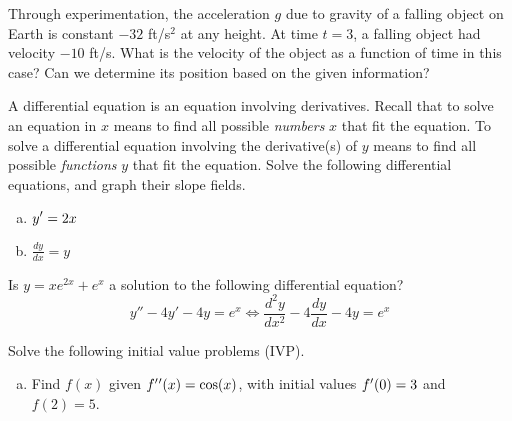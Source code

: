 \documentclass[answers]{exam}
\begin{document}
\begin{questions}
\question Through experimentation, the acceleration $g$ due to gravity of a falling object on Earth is constant $-32$ ft/s$^2$ at any height. At time $t = 3$, a falling object had velocity $-10$ ft/s. What is the velocity of the object as a function of time in this case? Can we determine its position based on the given information?

\hfill \break
\hfill \break
\hfill \break
\hfill \break
\hfill \break
\hfill \break
\hfill \break
\hfill \break
\hfill \break
\hfill \break
\hfill \break
\hfill \break
\hfill \break
\hfill \break
\hfill \break

\question A differential equation is an equation involving derivatives. Recall that to solve an equation in $x$ means to find all possible \emph{numbers} $x$ that fit the equation. To solve a differential equation involving the derivative(s) of $y$ means to find all possible \emph{functions} $y$ that fit the equation. Solve the following differential equations, and graph their slope fields.
\begin{enumerate}[(a)]
\item $\displaystyle y\rq{} = 2x$ 

\hfill \break
\hfill \break
\hfill \break
\hfill \break
\hfill \break

\newpage


\item $\displaystyle \frac{dy}{dx} = y$

\hfill \break
\hfill \break
\hfill \break
\hfill \break
\hfill \break
\hfill \break
\hfill \break
\hfill \break
\hfill \break
\hfill \break
\hfill \break
\hfill \break

\end{enumerate}

\question Is $y = xe^{2x}+e^x$ a solution to the following differential equation?
\[ y''-4y'-4y=e^x \iff \frac{d^2y}{dx^2}-4\frac{dy}{dx} -4y = e^x \]

\hfill \break
\hfill \break
\hfill \break
\hfill \break
\hfill \break
\hfill \break


\question Solve the following initial value problems (IVP).

\begin{enumerate}[(a)]
\item Find $f(x)$ given $f\rq{}\rq{}(x) = \cos(x)$, with initial values $f\rq{}(0) = 3$ and $f(2) = 5$.

\hfill \break
\hfill \break
\hfill \break
\hfill \break
\hfill \break
\hfill \break
\hfill \break
\hfill \break




\end{enumerate}
\end{questions}
\end{document}
